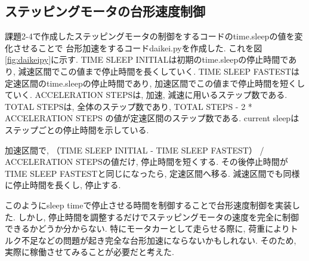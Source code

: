 \documentclass{ltjsarticle} %
\begin{document}
\subsection{ステッピングモータの台形速度制御}
課題2-4で作成したステッピングモータの制御をするコードのtime.sleepの値を変化させることで
台形加速をするコードdaikei.pyを作成した. これを図\ref{fig:daikeipy}に示す. 
TIME SLEEP INITIALは初期のtime.sleepの停止時間であり, 減速区間でこの値まで停止時間を長くしていく. 
TIME SLEEP FASTESTは定速区間のtime.sleepの停止時間であり, 加速区間でこの値まで停止時間を短くしていく. 
ACCELERATION STEPSは, 加速, 減速に用いるステップ数である. 
TOTAL STEPSは, 全体のステップ数であり, TOTAL STEPS - 2 * ACCELERATION STEPS の値が定速区間のステップ数である. 
current sleepはステップごとの停止時間を示している. 

加速区間で, （TIME SLEEP INITIAL - TIME SLEEP FASTEST） / ACCELERATION STEPSの値だけ, 停止時間を短くする. 
その後停止時間がTIME SLEEP FASTESTと同じになったら, 定速区間へ移る. 
減速区間でも同様に停止時間を長くし, 停止する. 

このようにsleep timeで停止させる時間を制御することで台形速度制御を実装した. 
しかし, 停止時間を調整するだけでステッピングモータの速度を完全に制御できるかどうか分からない.  
特にモータカーとして走らせる際に, 荷重によりトルク不足などの問題が起き完全な台形加速にならないかもしれない.  
そのため, 実際に稼働させてみることが必要だと考えた. 
\end{document}
